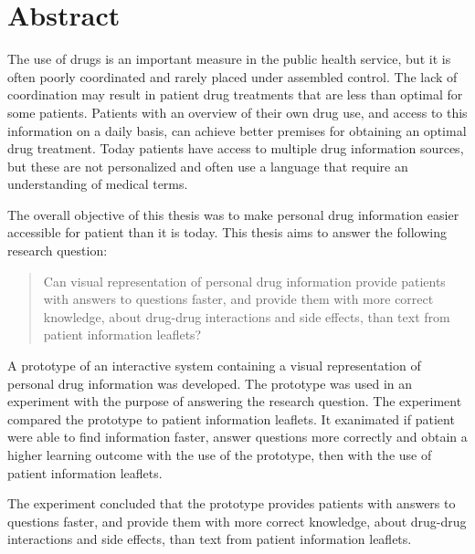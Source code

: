 \chapter*{Abstract}

The use of drugs is an important measure in the public health service, but it is often poorly coordinated and rarely placed under assembled control. The lack of coordination may result in patient drug treatments that are less than optimal for some patients. Patients with an overview of their own drug use, and access to this information on a daily basis, can achieve better premises for obtaining an optimal drug treatment. Today patients have access to multiple drug information sources, but these are not personalized and often use a language that require an understanding of medical terms.      

The overall objective of this thesis was to make personal drug information easier accessible for patient than it is today. This thesis aims to answer the following research question:
\begin{quote} Can visual representation of personal drug information provide patients with answers to questions faster, and provide them with more correct knowledge, about drug-drug interactions and side effects, than text from patient information leaflets?\end{quote}

A prototype of an interactive system containing a visual representation of personal drug information was developed. The prototype was used in an experiment with the purpose of answering the research question. The experiment compared the prototype to patient information leaflets. It exanimated if patient were able to find information faster, answer questions more correctly and obtain a higher learning outcome with the use of the prototype, then with the use of patient information leaflets.

The experiment concluded that the prototype provides patients with answers to questions faster, and provide them with more correct knowledge, about drug-drug interactions and side effects, than text from patient information leaflets.

